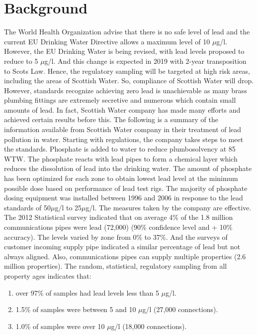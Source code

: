 \documentclass[11pt,twoside]{article}
\numberwithin{Theorem}{section}
\numberwithin{Definition}{section}
\numberwithin{Lemma}{section}
\numberwithin{Algorithm}{section}
\numberwithin{equation}{section}
\begin{document}
\section{Background}
\label{sec:background}
The World Health Organization advise that there is no safe level of lead and the current EU Drinking Water Directive allows a maximum level of 10 $\mu$g/l. However, the EU Drinking Water is being revised, with lead levels proposed to reduce to 5 $\mu$g/l. And this change is expected in 2019 with 2-year transposition to Scots Law. Hence, the regulatory sampling will be targeted at high risk areas, including the areas of Scottish Water. So, compliance of Scottish Water will drop. However, standards recognize achieving zero lead is unachievable as many brass plumbing fittings are extremely secretive and numerous which contain small amounts of lead.
In fact, Scottish Water company has made many efforts and achieved certain results before this. The following is a summary of the information available from Scottish Water company in their treatment of lead pollution in water.
Starting with regulations, the company takes steps to meet the standards. Phosphate is added to water to reduce plumbosolvency at 85 WTW. The phosphate reacts with lead pipes to form a chemical layer which reduces the dissolution of lead into the drinking water. The amount of phosphate has been optimized for each zone to obtain lowest lead level at the minimum possible dose based on performance of lead test rigs. The majority of phosphate dosing equipment was installed between 1996 and 2006 in response to the lead standards of 50$\mu$g/l to 25$\mu$g/l. The measures taken by the company are effective. The 2012 Statistical survey indicated that on average 4\% of the 1.8 million communications pipes were lead (72,000) (90\% confidence level and + 10\% accuracy). The levels varied by zone from 0\% to 37\%. And the surveys of customer incoming supply pipe indicated a similar percentage of lead but not always aligned. Also, communications pipes can supply multiple properties (2.6 million properties). The random, statistical, regulatory sampling from all property ages indicates that:

\begin{enumerate}
\item over 97\% of samples had lead levels less than 5 $\mu$g/l.
\item 1.5\% of samples were between 5 and 10 $\mu$g/l (27,000 connections).
\item 1.0\% of samples were over 10 $\mu$g/l (18,000 connections).
\end{enumerate}
\end{document}
